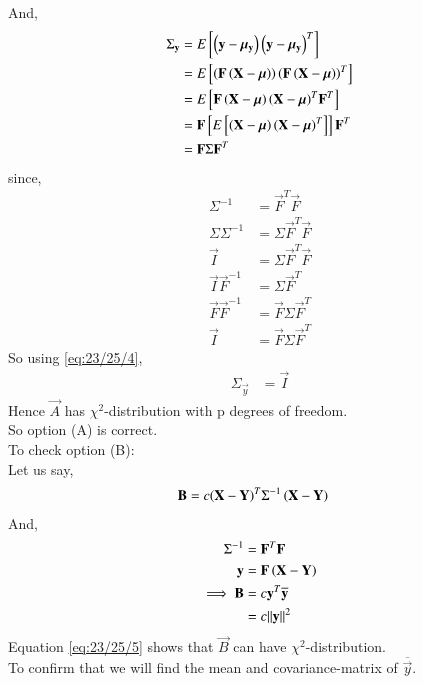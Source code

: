 \documentclass[journal,12pt,onecolumn]{IEEEtran}
\theoremstyle{remark}
\begin{document}
And,
\begin{align}
{\Sigma}_{\mathbf{y}} &= E{}\left[\left(\mathbf{y}-{\bm{\mu}}_{\mathbf{y}}\right){\left(\mathbf{y}-{\bm{\mu}}_{\mathbf{y}}\right)}^T\right] \\
                              &= E{}\left[\left(\mathbf{F}\left(\mathbf{X}-\bm{\mu}\right)\right){\left(\mathbf{F}\left(\mathbf{X}-\bm{\mu}\right)\right)}^T\right] \\
                              &= E{}\left[\mathbf{F}\left(\mathbf{X}-\bm{\mu}\right){\left(\mathbf{X}-\bm{\mu}\right)}^T{\mathbf{F}}^T\right] \\
                              &= \mathbf{F}{}\left[E{}\left[\left(\mathbf{X}-\bm{\mu}\right){\left(\mathbf{X}-\bm{\mu}\right)}^T\right]\right]{\mathbf{F}}^T \\
                              &= \mathbf{F} \Sigma {\mathbf{F}}^T 
\end{align}
since,
\begin{align}
{\Sigma}^{-1} &= {\vec{F}}^T\vec{F} \\
\Sigma{\Sigma}^{-1} &= \Sigma{\vec{F}}^T\vec{F} \\
\vec{I} &= \Sigma{\vec{F}}^T\vec{F} \\
\vec{I}{\vec{F}}^{-1} &= \Sigma{\vec{F}}^T \\
\vec{F}{\vec{F}}^{-1} &= \vec{F}\Sigma{\vec{F}}^T \\
\vec{I} &= \vec{F}\Sigma{\vec{F}}^T    \label{eq:23/25/4}
\end{align}
So using \eqref{eq:23/25/4},
\begin{align}
{\Sigma}_{\vec{y}} &= \vec{I}
\end{align}
Hence $\vec{A}$ has ${\chi}^2$-distribution with p degrees of freedom. \\
So option (A) is correct.\\
To check option (B): \\
Let us say,
\begin{align}
\mathbf{B} &= c{\left(\mathbf{X}-\mathbf{Y}\right)^T}{\Sigma}^{-1}\left(\mathbf{X}-\mathbf{Y}\right)
\end{align}
And,
\begin{align}
{\Sigma}^{-1} &= {\mathbf{F}}^T\mathbf{F}  \\
\mathbf{y} &= \mathbf{F}\left(\mathbf{X}-\mathbf{Y}\right) \\
\implies \mathbf{B} &= c{\mathbf{y}}^T\overline{\mathbf{y}} \\
                 &= c{\left\lVert\mathbf{y}\right\rVert}^2  \label{eq:23/25/5}
\end{align}
Equation \eqref{eq:23/25/5} shows that $\vec{B}$ can have ${\chi}^2$-distribution. \\
To confirm that we will find the mean and covariance-matrix of $\overline{\vec{y}}$.
\end{document}
